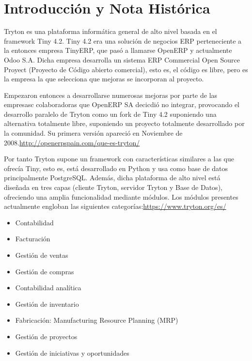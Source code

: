 \documentclass{article}
\begin{document}
\maketitle



\newpage
\tableofcontents
\newpage


\section{Introducción y Nota Histórica}

Tryton es una plataforma informática general de alto nivel basada en el framework Tiny 4.2. Tiny 4.2 era una solución de negocios ERP perteneciente a la entonces empresa TinyERP, que pasó a llamarse OpenERP y actualmente Odoo S.A. Dicha empresa desarrolla un sistema ERP Commercial Open Source Proyect (Proyecto de Código abierto comercial), esto es, el código es libre, pero es la empresa la que selecciona que mejoras se incorporan al proyecto.

Empezaron entonces a desarrollarse numerosas mejoras por parte de las empresasc colaboradoras que OpenERP SA decicdió no integrar, provocando el desarrollo paralelo de Tryton como un fork de Tiny 4.2 suponiendo una alternativa totalmente libre, suponiendo un proyecto totalmente desarrollado por la comunidad. Su primera versión apareció en Noviembre de 2008.\url{http://openerpspain.com/que-es-tryton/}

Por tanto Tryton supone un framework con características similares a las que ofrecía Tiny, esto es, está desarrollado en Python y usa como base de datos principalmente PostgreSQL. Además, dicha plataforma de alto nivel está diseñada en tres capas (cliente Tryton, servidor Tryton y Base de Datos), ofreciendo una amplia funcionalidad mediante módulos. Los módulos presentes actualmente engloban las siguientes categorías:\url{https://www.tryton.org/es/}

\begin{itemize}
    \item Contabilidad
    \item Facturación
    \item Gestión de ventas
    \item Gestión de compras
    \item Contabilidad analítica
    \item Gestión de inventario
    \item Fabricación: Manufacturing Resource Planning (MRP)
    \item Gestión de proyectos
    \item Gestión de iniciativas y oportunidades
\end{itemize}
\end{document}
